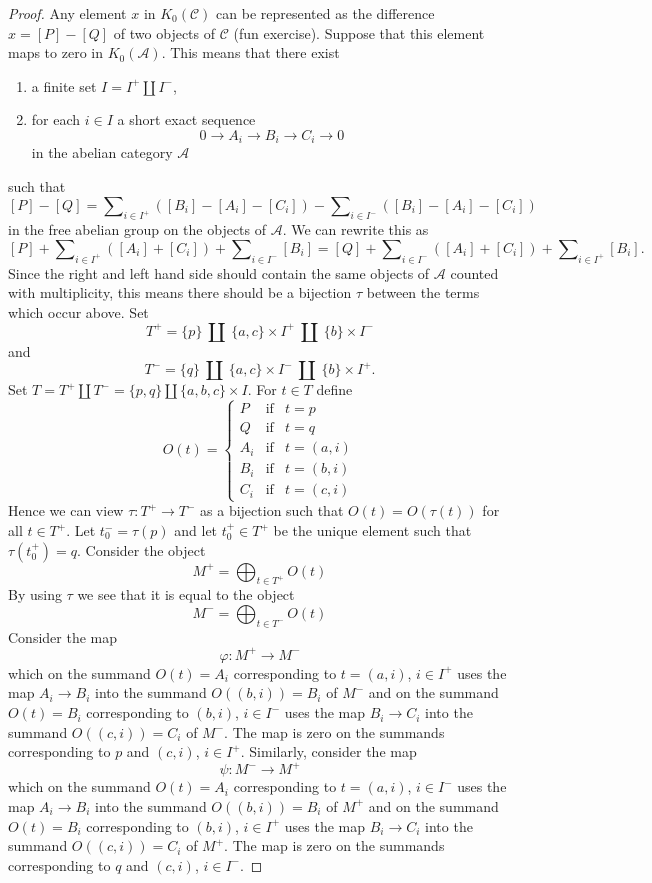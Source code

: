 \begin{proof}
\medskip\noindent
Any element $x$ in $K_0(\mathcal{C})$ can be represented as the
difference $x = [P] - [Q]$ of two objects of $\mathcal{C}$ (fun exercise).
Suppose that this element maps to zero in $K_0(\mathcal{A})$.
This means that there exist
\begin{enumerate}
\item a finite set $I = I^{+} \amalg I^{-}$,
\item for each $i \in I$ a short exact sequence
$$
0 \to A_i \to B_i \to C_i \to 0
$$
in the abelian category $\mathcal{A}$
\end{enumerate}
such that
$$
[P] - [Q] =
\sum\nolimits_{i \in I^{+}} ([B_i] - [A_i] - [C_i])
-
\sum\nolimits_{i \in I^{-}} ([B_i] - [A_i] - [C_i])
$$
in the free abelian group on the objects of $\mathcal{A}$.
We can rewrite this as
$$
[P]
+ \sum\nolimits_{i \in I^{+}} ([A_i] + [C_i])
+ \sum\nolimits_{i \in I^{-}} [B_i]
=
[Q]
+ \sum\nolimits_{i \in I^{-}} ([A_i] + [C_i])
+ \sum\nolimits_{i \in I^{+}} [B_i].
$$
Since the right and left hand side should contain the same objects
of $\mathcal{A}$ counted with multiplicity, this means there should be
a bijection $\tau$ between the terms which occur above. Set
$$
T^{+} =
\{p\}\ \amalg\ \{a, c\} \times I^{+}\ \amalg\ \{b\} \times I^{-}
$$
and
$$
T^{-} =
\{q\}\ \amalg\ \{a, c\} \times I^{-}\ \amalg\ \{b\} \times I^{+}.
$$
Set $T = T^{+} \amalg T^{-} = \{p, q\} \amalg \{a, b, c\} \times I$.
For $t \in T$ define
$$
O(t)
=
\left\{
\begin{matrix}
P & \text{if} & t = p \\
Q & \text{if} & t = q \\
A_i & \text{if} & t = (a, i) \\
B_i & \text{if} & t = (b, i) \\
C_i & \text{if} & t = (c, i)
\end{matrix}
\right.
$$
Hence we can view $\tau : T^{+} \to T^{-}$ as a bijection
such that $O(t) = O(\tau(t))$ for all $t \in T^{+}$.
Let $t^{-}_0 = \tau(p)$ and let $t^{+}_0 \in T^{+}$ be the
unique element such that $\tau(t^{+}_0) = q$.
Consider the object
$$
M^{+} = \bigoplus\nolimits_{t \in T^{+}} O(t)
$$
By using $\tau$ we see that it is equal to the object
$$
M^{-} = \bigoplus\nolimits_{t \in T^{-}} O(t)
$$
Consider the map
$$
\varphi : M^{+} \longrightarrow M^{-}
$$
which on the summand $O(t) = A_i$ corresponding to $t = (a, i)$, $i \in I^{+}$
uses the map $A_i \to B_i$ into the summand $O((b, i)) = B_i$ of $M^{-}$
and on the summand $O(t) = B_i$ corresponding to $(b, i)$, $i \in I^{-}$
uses the map $B_i \to C_i$ into the summand $O((c, i)) = C_i$ of $M^{-}$.
The map is zero on the summands corresponding to $p$
and $(c, i)$, $i \in I^{+}$.
Similarly, consider the map
$$
\psi : M^{-} \longrightarrow M^{+}
$$
which on the summand $O(t) = A_i$ corresponding to $t = (a, i)$, $i \in I^{-}$
uses the map $A_i \to B_i$ into the summand $O((b, i)) = B_i$ of $M^{+}$
and on the summand $O(t) = B_i$ corresponding to $(b, i)$, $i \in I^{+}$
uses the map $B_i \to C_i$ into the summand $O((c, i)) = C_i$ of $M^{+}$.
The map is zero on the summands corresponding to $q$ and
$(c, i)$, $i \in I^{-}$.


\end{proof}

